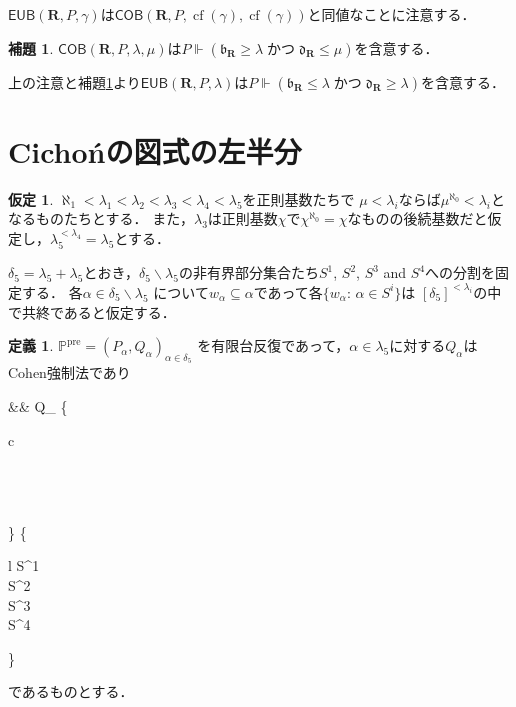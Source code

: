 \documentclass[uplatex,dvipdfmx]{jsarticle}
\newcommand\forces{\Vdash}
\newcommand{\AND}{\mathbin{\text{かつ}}}
\newcommand{\frakb}{\mathfrak{b}}
\newcommand{\frakd}{\mathfrak{d}}
\newcommand{\cf}{\operatorname{cf}}
\newcommand{\EUB}{\mathsf{EUB}}
\newcommand{\COB}{\mathsf{COB}}
\newcommand{\relR}{\mathbf{R}}
\newcommand{\Pa}{\mathbb{P}^\mathrm{pre}}
\renewcommand{\setminus}{\smallsetminus}
\theoremstyle{definition}
\newtheorem{defi}[thm]{定義}
\newtheorem{lem}[thm]{補題}
\newtheorem{assumption}[thm]{仮定}
\begin{document}
	$\EUB(\relR, P, \gamma)$は$\COB(\relR, P, \cf(\gamma), \cf(\gamma))$と同値なことに注意する．
	
	\begin{lem}\label{lem:cobimpliesineq}
		$\COB(\relR, P, \lambda, \mu)$は$P \forces (\frakb_\relR \ge \lambda \AND \frakd_\relR \le \mu)$を含意する．
	\end{lem}

	上の注意と補題\ref{lem:cobimpliesineq}より$\EUB(\relR, P, \lambda)$は$P \forces (\frakb_\relR \le \lambda \AND \frakd_\relR \ge \lambda)$を含意する．
	
	\section{Cichońの図式の左半分}
	
	\begin{assumption}\label{asm:P}
		$\aleph_1<\lambda_1<\lambda_2<\lambda_3<\lambda_4<\lambda_5$を正則基数たちで
		$\mu<\lambda_i$ならば$\mu^{\aleph_0}<\lambda_i$となるものたちとする．
		また，$\lambda_3$は正則基数$\chi$で$\chi^{\aleph_0}=\chi$なものの後続基数だと仮定し，$\lambda_5^{<\lambda_4}=\lambda_5$とする．
		
		$\delta_5=\lambda_5+\lambda_5$とおき，$\delta_5\setminus\lambda_5$の非有界部分集合たち$S^1$, $S^2$, $S^3$ and $S^4$への分割を固定する．
		各$\alpha\in \delta_5\setminus\lambda_5$ について$w_\alpha\subseteq \alpha$であって各$\{w_\alpha:\, \alpha\in S^i\}$は $[\delta_5]^{{<}\lambda_i}$の中で共終であると仮定する．
	\end{assumption}
	
	\begin{defi}\label{def:Pa}
		$\Pa=(P_\alpha,Q_\alpha)_{\alpha\in\delta_5}$ 
		を有限台反復であって，$\alpha\in \lambda_5$に対する$Q_\alpha$はCohen強制法であり
		\begin{flalign*}
			&&
			Q_\alpha\text{ は$w_\alpha$-部分的 }
			\left\{
			\begin{array}{c}
				\\
				\\
				\\
				\\
			\end{array}\right\}
			 \hspace{0.5cm} \text{($\alpha$が}
			\left\{
			\begin{array}{l}
				S^1\\
				S^2\\
				S^3\\
				S^4\\
			\end{array}
			\right\} 
			\\
		\end{flalign*}
		であるものとする．
	\end{defi}
	
\end{document}
